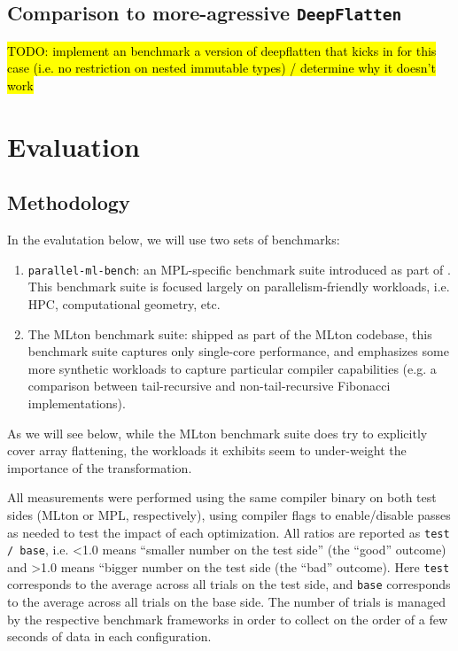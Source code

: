 \documentclass[leqno,11pt]{article}
\begin{document}


\subsection{Comparison to more-agressive \texttt{DeepFlatten}}

\hl{TODO: implement an benchmark a version of deepflatten that kicks in for this
  case (i.e. no restriction on nested immutable types) / determine why it
  doesn't work}

\section{Evaluation}

\subsection{Methodology}
In the evalutation below, we will use two sets of benchmarks:
\begin{enumerate}
\item \texttt{parallel-ml-bench}: an MPL-specific benchmark suite introduced as
  part of \cite{mpl-orig}. This benchmark suite is focused largely on
  parallelism-friendly workloads, i.e. HPC, computational geometry, etc.

\item The MLton benchmark suite: shipped as part of the MLton codebase, this
  benchmark suite captures only single-core performance, and emphasizes some
  more synthetic workloads to capture particular compiler capabilities (e.g. a
  comparison between tail-recursive and non-tail-recursive Fibonacci
  implementations).

\end{enumerate}

As we will see below, while the MLton benchmark suite does try to explicitly
cover array flattening, the workloads it exhibits seem to under-weight the
importance of the transformation.

All measurements were performed using the same compiler binary on both test
sides (MLton or MPL, respectively), using compiler flags to enable/disable
passes as needed to test the impact of each optimization. All ratios are
reported as \texttt{test / base}, i.e. <1.0 means ``smaller number on the test
side'' (the ``good'' outcome) and >1.0 means ``bigger number on the test side
(the ``bad'' outcome). Here \texttt{test} corresponds to the average across all
trials on the test side, and \texttt{base} corresponds to the average across all
trials on the base side. The number of trials is managed by the respective
benchmark frameworks in order to collect on the order of a few seconds of data
in each configuration.
\end{document}
